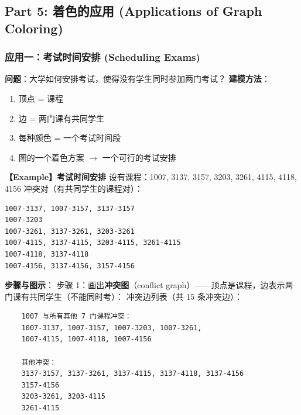 \documentclass[10pt,a4paper,openany]{ctexbook}
\theoremstyle{definition}
\theoremstyle{remark}
\begin{document}
\subsection{Part 5: 着色的应用 (Applications of Graph Coloring)}

\subsubsection{应用一：考试时间安排 (Scheduling Exams)}

\textbf{问题}：大学如何安排考试，使得没有学生同时参加两门考试？
\textbf{建模方法}：
\begin{enumerate}
\item 顶点 = 课程
\item 边 = 两门课有共同学生
\item 每种颜色 = 一个考试时间段
\item 图的一个着色方案 $\rightarrow$ 一个可行的考试安排

\end{enumerate}

\textbf{【Example】考试时间安排}
设有课程：1007, 3137, 3157, 3203, 3261, 4115, 4118, 4156
冲突对（有共同学生的课程对）：
{\footnotesize\begin{verbatim}
1007-3137, 1007-3157, 3137-3157
1007-3203
1007-3261, 3137-3261, 3203-3261
1007-4115, 3137-4115, 3203-4115, 3261-4115
1007-4118, 3137-4118
1007-4156, 3137-4156, 3157-4156
\end{verbatim}}

\textbf{步骤与图示}：
步骤 1：画出\textbf{冲突图}（conflict graph）——顶点是课程，边表示两门课有共同学生（不能同时考）：
冲突边列表（共 15 条冲突边）：
{\footnotesize\begin{verbatim}
    1007 与所有其他 7 门课程冲突：
    1007-3137, 1007-3157, 1007-3203, 1007-3261,
    1007-4115, 1007-4118, 1007-4156

    其他冲突：
    3137-3157, 3137-3261, 3137-4115, 3137-4118, 3137-4156
    3157-4156
    3203-3261, 3203-4115
    3261-4115
\end{verbatim}}
\end{document}
